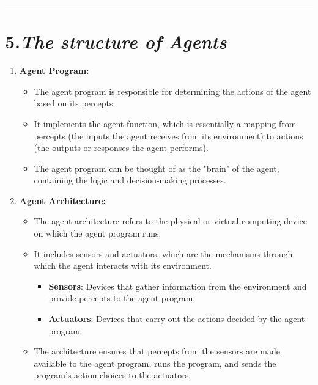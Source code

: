 \documentclass[
]{article}
\begin{document}
\begin{center}\rule{0.5\linewidth}{0.5pt}\end{center}

\section{\texorpdfstring{5.\emph{The structure of
Agents}}{5.The structure of Agents}}\label{5the-structure-of-agents}

\begin{enumerate}
\def\labelenumi{\arabic{enumi}.}
\item
  \textbf{Agent Program:}

  \begin{itemize}
  \item
    The agent program is responsible for determining the actions of the
    agent based on its percepts.
  \item
    It implements the agent function, which is essentially a mapping
    from percepts (the inputs the agent receives from its environment)
    to actions (the outputs or responses the agent performs).
  \item
    The agent program can be thought of as the "brain" of the agent,
    containing the logic and decision-making processes.
  \end{itemize}
\item
  \textbf{Agent Architecture:}

  \begin{itemize}
  \item
    The agent architecture refers to the physical or virtual computing
    device on which the agent program runs.
  \item
    It includes sensors and actuators, which are the mechanisms through
    which the agent interacts with its environment.

    \begin{itemize}
    \item
      \textbf{Sensors}: Devices that gather information from the
      environment and provide percepts to the agent program.
    \item
      \textbf{Actuators}: Devices that carry out the actions decided by
      the agent program.
    \end{itemize}
  \item
    The architecture ensures that percepts from the sensors are made
    available to the agent program, runs the program, and sends the
    program's action choices to the actuators.
  \end{itemize}
\end{enumerate}
\end{document}
